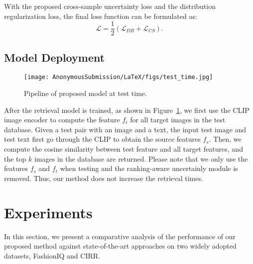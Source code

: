 \documentclass[letterpaper]{article} \usepackage{aaai24}  \usepackage{times}  \usepackage{helvet}  \usepackage{courier}  \usepackage[hyphens]{url}  \usepackage{graphicx} \urlstyle{rm} \def\UrlFont{\rm}  \usepackage{natbib}  \usepackage{caption} \frenchspacing  \setlength{\pdfpagewidth}{8.5in} \setlength{\pdfpageheight}{11in} \usepackage{amsmath,amsfonts}
\begin{document}
With the proposed cross-sample uncertainty loss and the distribution regularization loss,
the final loss function can be formulated as:
\begin{equation}
    \mathcal{L} = \frac{1}{2}(\mathcal{L}_{DR} + \mathcal{L}_{CS}).
\end{equation}



\subsection{Model Deployment}

\begin{figure}[htb]
    \centering
    \texttt{[image: AnonymousSubmission/LaTeX/figs/test\_time.jpg]}
    \caption{Pipeline of proposed model at test time.}
    \label{fig:test time}
\end{figure}

After the retrieval model is trained, as shown in Figure~\ref{fig:test time}, we first use the CLIP image encoder to compute the feature $f_t$ for all target images in the test database. Given a test pair with an image and a text, 
the input test image and test text first go through the CLIP to obtain the source features $f_s$. Then, we compute the cosine similarity between test feature and all target features, and the top $k$  images in the database are returned. Please note that we only use the features $f_s$ and $f_t$ when testing and the ranking-aware uncertainly module is removed. Thus, our method does not increase the retrieval times.  

\section{Experiments}
In this section, we present a comparative analysis of the performance of our proposed method against state-of-the-art approaches on two widely adopted datasets, FashionIQ and CIRR.
\end{document}
